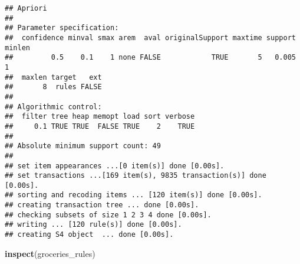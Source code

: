 \documentclass[]{article}
\newenvironment{Shaded}{\begin{snugshade}}{\end{snugshade}}
\newcommand{\KeywordTok}[1]{\textcolor[rgb]{0.13,0.29,0.53}{\textbf{#1}}}
\newcommand{\NormalTok}[1]{#1}
\begin{document}
\begin{verbatim}
## Apriori
## 
## Parameter specification:
##  confidence minval smax arem  aval originalSupport maxtime support minlen
##         0.5    0.1    1 none FALSE            TRUE       5   0.005      1
##  maxlen target   ext
##       8  rules FALSE
## 
## Algorithmic control:
##  filter tree heap memopt load sort verbose
##     0.1 TRUE TRUE  FALSE TRUE    2    TRUE
## 
## Absolute minimum support count: 49 
## 
## set item appearances ...[0 item(s)] done [0.00s].
## set transactions ...[169 item(s), 9835 transaction(s)] done [0.00s].
## sorting and recoding items ... [120 item(s)] done [0.00s].
## creating transaction tree ... done [0.00s].
## checking subsets of size 1 2 3 4 done [0.00s].
## writing ... [120 rule(s)] done [0.00s].
## creating S4 object  ... done [0.00s].
\end{verbatim}

\begin{Shaded}
\begin{Highlighting}[]
\KeywordTok{inspect}\NormalTok{(groceries_rules)}
\end{Highlighting}
\end{Shaded}
\end{document}
